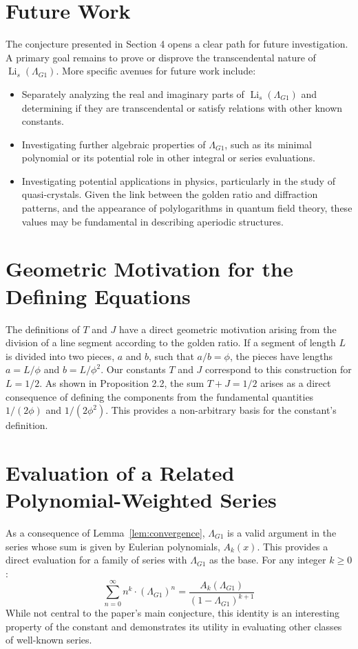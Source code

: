 \documentclass{amsart}
\theoremstyle{plain}
\theoremstyle{definition}
\theoremstyle{remark}
\DeclareMathOperator{\Li}{Li} %
\newcommand{\LambdaG}{\Lambda_{G1}}
\newcommand{\phiG}{\phi}
\begin{document}
\section{Future Work}
The conjecture presented in Section 4 opens a clear path for future investigation. A primary goal remains to prove or disprove the transcendental nature of $\Li_s(\LambdaG)$. More specific avenues for future work include:
\begin{itemize}
    \item Separately analyzing the real and imaginary parts of $\Li_s(\LambdaG)$ and determining if they are transcendental or satisfy relations with other known constants.
    \item Investigating further algebraic properties of $\LambdaG$, such as its minimal polynomial or its potential role in other integral or series evaluations.
    \item Investigating potential applications in physics, particularly in the study of quasi-crystals. Given the link between the golden ratio and diffraction patterns, and the appearance of polylogarithms in quantum field theory, these values may be fundamental in describing aperiodic structures.
\end{itemize}

\appendix
\section{Geometric Motivation for the Defining Equations}
The definitions of $T$ and $J$ have a direct geometric motivation arising from the division of a line segment according to the golden ratio. If a segment of length $L$ is divided into two pieces, $a$ and $b$, such that $a/b = \phiG$, the pieces have lengths $a=L/\phiG$ and $b=L/\phiG^2$. Our constants $T$ and $J$ correspond to this construction for $L=1/2$. As shown in Proposition 2.2, the sum $T+J=1/2$ arises as a direct consequence of defining the components from the fundamental quantities $1/(2\phiG)$ and $1/(2\phiG^2)$. This provides a non-arbitrary basis for the constant's definition.

\section{Evaluation of a Related Polynomial-Weighted Series}
As a consequence of Lemma~\ref{lem:convergence}, $\LambdaG$ is a valid argument in the series whose sum is given by Eulerian polynomials, $A_k(x)$. This provides a direct evaluation for a family of series with $\LambdaG$ as the base. For any integer $k \ge 0$:
\[ \sum_{n=0}^{\infty} n^k \cdot (\LambdaG)^n = \frac{A_k(\LambdaG)}{(1-\LambdaG)^{k+1}} \]
While not central to the paper's main conjecture, this identity is an interesting property of the constant and demonstrates its utility in evaluating other classes of well-known series.
\end{document}
